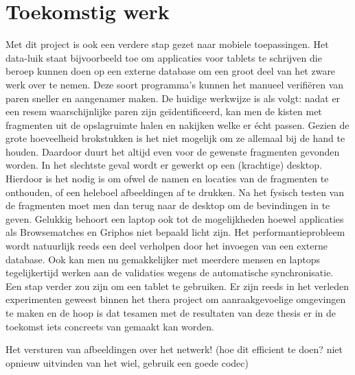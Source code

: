 \chapter{Toekomstig werk}
\label{toekomst}

Met dit project is ook een verdere stap gezet naar mobiele toepassingen. Het data-luik staat bijvoorbeeld toe om applicaties voor tablets te schrijven die beroep kunnen doen op een externe database om een groot deel van het zware werk over te nemen. Deze soort programma's kunnen het manueel verifi\"eren van paren sneller en aangenamer maken. De huidige werkwijze is als volgt: nadat er een resem waarschijnlijke paren zijn ge\"identificeerd, kan men de kisten met fragmenten uit de opslagruimte halen en nakijken welke er \'echt passen. Gezien de grote hoeveelheid brokstukken is het niet mogelijk om ze allemaal bij de hand te houden. Daardoor duurt het altijd even voor de gewenste fragmenten gevonden worden. In het slechtste geval wordt er gewerkt op een (krachtige) desktop. Hierdoor is het nodig is om ofwel de namen en locaties van de fragmenten te onthouden, of een heleboel afbeeldingen af te drukken. Na het fysisch testen van de fragmenten moet men dan terug naar de desktop om de bevindingen in te geven. Gelukkig behoort een laptop ook tot de mogelijkheden hoewel applicaties als Browsematches en Griphos niet bepaald licht zijn. Het performantieprobleem wordt natuurlijk reeds een deel verholpen door het invoegen van een externe database. Ook kan men nu gemakkelijker met meerdere mensen en laptops tegelijkertijd werken aan de validaties wegens de automatische synchronisatie. Een stap verder zou zijn om een tablet te gebruiken. Er zijn reeds in het verleden experimenten geweest binnen het thera project om aanraakgevoelige omgevingen te maken en de hoop is dat tesamen met de resultaten van deze thesis er in de toekomst iets concreets van gemaakt kan worden.

Het versturen van afbeeldingen over het netwerk! (hoe dit efficient te doen? niet opnieuw uitvinden van het wiel, gebruik een goede codec)